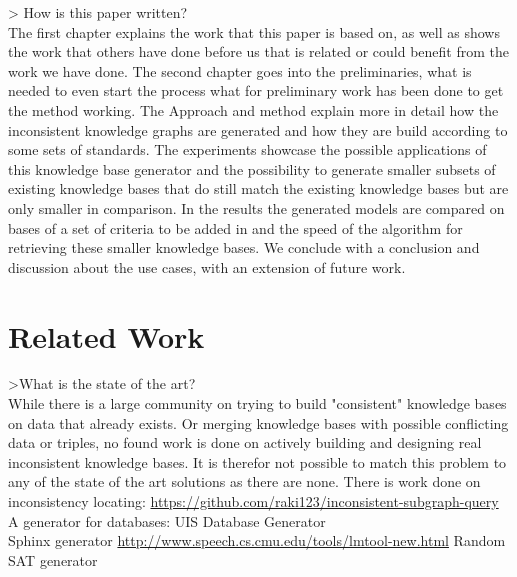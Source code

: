 \documentclass{article}
\begin{document}
> How is this paper written?\\
The first chapter explains the work that this paper is based on, as well as shows the work that others have done before us that is related or could benefit from the work we have done. The second chapter goes into the preliminaries, what is needed to even start the process what for preliminary work has been done to get the method working. The Approach and method explain more in detail how the inconsistent knowledge graphs are generated and how they are build according to some sets of standards. The experiments showcase the possible applications of this knowledge base generator and the possibility to generate smaller subsets of existing knowledge bases that do still match the existing knowledge bases but are only smaller in comparison. In the results the generated models are compared on bases of a set of criteria to be added in and the speed of the algorithm for retrieving these smaller knowledge bases. We conclude with a conclusion and discussion about the use cases, with an extension of future work.

\newpage
\section{Related Work}
>What is the state of the art?\\
While there is a large community on trying to build "consistent" knowledge bases on data that already exists. Or merging knowledge bases with possible conflicting data or triples, no found work is done on actively building and designing real inconsistent knowledge bases. It is therefor not possible to match this problem to any of the state of the art solutions as there are none. 
There is work done on inconsistency locating: \url{https://github.com/raki123/inconsistent-subgraph-query}\\
A generator for databases: UIS Database Generator\\
Sphinx generator \url{http://www.speech.cs.cmu.edu/tools/lmtool-new.html}
Random SAT generator
\end{document}
